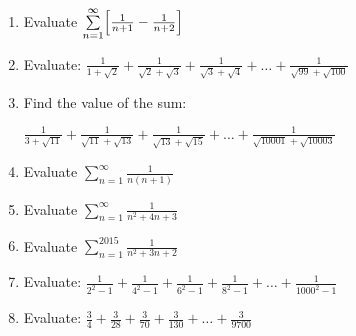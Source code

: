 \documentclass[../main.tex]{subfiles}
\begin{document}
\label{telescoping sums}
\begin{enumerate}[itemsep=1cm]
    \item 
    Evaluate $\sum\limits_{n=1}^\infty \Bigl[\frac{1}{n+1}-\frac{1}{n+2}\Bigr]$

    \item 
    Evaluate: $\frac{1}{1+\sqrt{2}}+\frac{1}{\sqrt{2}+\sqrt{3}}+\frac{1}{\sqrt{3}+\sqrt{4}}+\dots +\frac{1}{\sqrt{99}+\sqrt{100}}$

    \item 
    Find the value of the sum:

    $\frac{1}{3+\sqrt{11}}+\frac{1}{\sqrt{11}+\sqrt{13}}+\frac{1}{\sqrt{13}+\sqrt{15}}+\dots +\frac{1}{\sqrt{10001}+\sqrt{10003}}$

    \item 
    Evaluate $\sum\limits_{n=1}^\infty \frac{1}{n(n+1)}$

    \item 
    Evaluate $\sum\limits_{n=1}^\infty \frac{1}{n^2 +4n+3}$

    \item 
    Evaluate $\sum\limits_{n=1}^{2015} \frac{1}{n^2 +3n+2}$

    \item 
    Evaluate: $\frac{1}{2^2-1}+\frac{1}{4^2-1}+\frac{1}{6^2-1}+\frac{1}{8^2-1}+\dots +\frac{1}{1000^2-1}$

    \item 
    Evaluate: $\frac{3}{4}+\frac{3}{28}+\frac{3}{70}+\frac{3}{130}+\dots +\frac{3}{9700}$

\end{enumerate}
\end{document}

